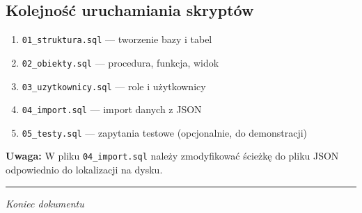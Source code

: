 \documentclass[12pt,a4paper]{article}
\begin{document}
\subsection{Kolejność uruchamiania skryptów}

\begin{enumerate}
    \item \texttt{01\_struktura.sql} --- tworzenie bazy i tabel
    \item \texttt{02\_obiekty.sql} --- procedura, funkcja, widok
    \item \texttt{03\_uzytkownicy.sql} --- role i użytkownicy
    \item \texttt{04\_import.sql} --- import danych z JSON
    \item \texttt{05\_testy.sql} --- zapytania testowe (opcjonalnie, do demonstracji)
\end{enumerate}

\textbf{Uwaga:} W pliku \texttt{04\_import.sql} należy zmodyfikować ścieżkę do pliku JSON odpowiednio do lokalizacji na dysku.

\vspace{1cm}
\hrule
\vspace{0.5cm}
\begin{center}
\textit{Koniec dokumentu}
\end{center}
\end{document}
